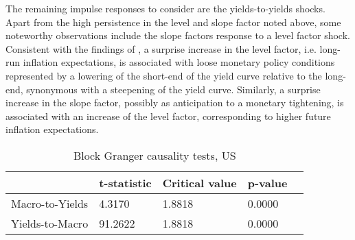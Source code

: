 The remaining impulse responses to consider are the yields-to-yields shocks. 
Apart from the high persistence in the level and slope factor noted above, some noteworthy observations include the slope factors response to a level factor shock.
Consistent with the findings of \citet{diebold2006macroeconomy}, a surprise increase in the level factor, i.e. long-run inflation expectations, is associated with loose monetary policy conditions represented by a lowering of the short-end of the yield curve relative to the long-end, synonymous with a steepening of the yield curve.
Similarly, a surprise increase in the slope factor, possibly as anticipation to a monetary tightening, is associated with an increase of the level factor, corresponding to higher future inflation expectations. 




\begin{table}[!t]
    \centering
    \begin{tabular}{lllll}
    \toprule
    {} &     t-statistic &      Critical value &                 p-value 
    \\
    \midrule
    Macro-to-Yields &  4.3170 &  1.8818 &  0.0000 &  \\
    Yields-to-Macro &  91.2622 &  1.8818 &  0.0000  \\
\bottomrule
    \end{tabular}
    \caption{Block Granger causality tests, US}
    \label{tab:granger_us}
\end{table}




